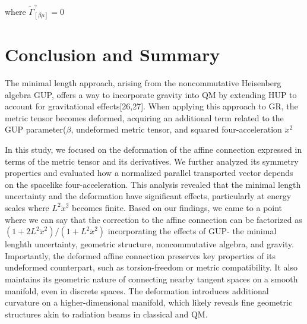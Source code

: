 \documentclass{article}
\begin{document}
where $\tilde{\Gamma}^{\gamma}_{[\beta\mu]}=0$

\section{\Large Conclusion and Summary}



The minimal length approach, arising from the noncommutative Heisenberg algebra GUP, offers a way to incorporate gravity into QM by extending HUP to account for gravitational effects[26,27]. When applying this approach to GR, the metric tensor becomes deformed, acquiring an additional term related to the GUP parameter($\beta$, undeformed metric tensor, and squared four-acceleration $\ddot x^2$

In this study, we focused on the deformation of the affine connection  expressed in terms of the metric tensor and its derivatives. We further analyzed its symmetry properties and evaluated how a normalized parallel transported vector depends on the spacelike four-acceleration. This analysis revealed that the minimal length uncertainty and the deformation have significant effects, particularly at energy scales where $ L^2\ddot x^2$ becomes finite.
Based on our findings, we came to a point where we can say that the correction to the affine connection can be factorized as $(1 + 2L^2\ddot x^2)/(1 + L^2\ddot x^2)$ incorporating the effects of GUP- the minimal lenghth uncertainty, geometric structure, noncommutative algebra, and gravity. Importantly, the deformed affine connection preserves key properties of its undeformed counterpart, such as torsion-freedom or metric compatibility. It also maintains its geometric nature of connecting nearby tangent spaces on a smooth manifold, even in discrete spaces. The deformation introduces additional curvature on a higher-dimensional manifold, which likely reveals fine geometric structures akin to radiation beams in classical and QM.
\end{document}
